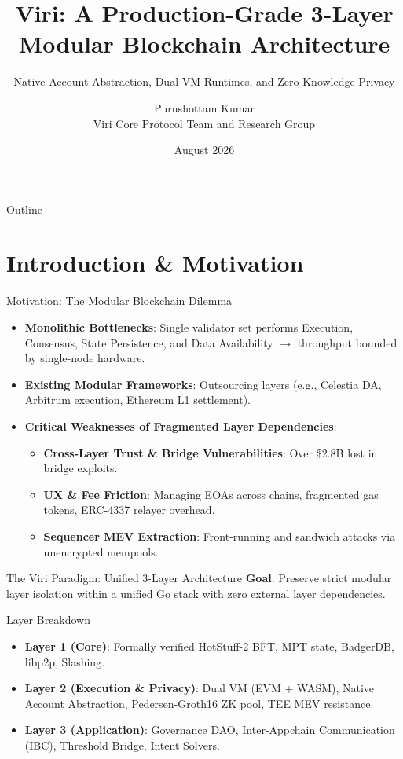 \documentclass[10pt]{beamer}
\title[Viri Blockchain]{Viri: A Production-Grade 3-Layer Modular Blockchain Architecture}
\subtitle{Native Account Abstraction, Dual VM Runtimes, and Zero-Knowledge Privacy}
\author[P. Kumar et al.]{Purushottam Kumar \\ \footnotesize Viri Core Protocol Team and Research Group}
\institute[Viri Research]{rockysinghrajput05@gmail.com \quad \url{https://viri.me}}
\date{August 2026}
\begin{document}
\begin{frame}
  \titlepage
\end{frame}

\begin{frame}{Outline}
  \tableofcontents
\end{frame}

\section{Introduction \& Motivation}

\begin{frame}{Motivation: The Modular Blockchain Dilemma}
  \begin{itemize}
    \item \textbf{Monolithic Bottlenecks}: Single validator set performs Execution, Consensus, State Persistence, and Data Availability $\rightarrow$ throughput bounded by single-node hardware.
    \item \textbf{Existing Modular Frameworks}: Outsourcing layers (e.g., Celestia DA, Arbitrum execution, Ethereum L1 settlement).
    \item \textbf{Critical Weaknesses of Fragmented Layer Dependencies}:
      \begin{itemize}
        \item \textbf{Cross-Layer Trust \& Bridge Vulnerabilities}: Over \$2.8B lost in bridge exploits.
        \item \textbf{UX \& Fee Friction}: Managing EOAs across chains, fragmented gas tokens, ERC-4337 relayer overhead.
        \item \textbf{Sequencer MEV Extraction}: Front-running and sandwich attacks via unencrypted mempools.
      \end{itemize}
  \end{itemize}
\end{frame}

\begin{frame}{The Viri Paradigm: Unified 3-Layer Architecture}
  \textbf{Goal}: Preserve strict modular layer isolation within a unified Go stack with \alert{zero external layer dependencies}.
  
  \vspace{0.3cm}
  \begin{block}{Layer Breakdown}
    \begin{itemize}
      \item \textbf{Layer 1 (Core)}: Formally verified HotStuff-2 BFT, MPT state, BadgerDB, libp2p, Slashing.
      \item \textbf{Layer 2 (Execution \& Privacy)}: Dual VM (EVM + WASM), Native Account Abstraction, Pedersen-Groth16 ZK pool, TEE MEV resistance.
      \item \textbf{Layer 3 (Application)}: Governance DAO, Inter-Appchain Communication (IBC), Threshold Bridge, Intent Solvers.
    \end{itemize}
  \end{block}
\end{frame}
\end{document}
